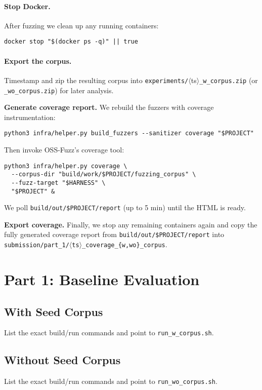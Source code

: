 \documentclass[11pt,a4paper,twocolumn]{article}
\begin{document}
\noindent \paragraph{Stop Docker.}
After fuzzing we clean up any running containers:
\begin{verbatim}
docker stop "$(docker ps -q)" || true
    \end{verbatim}

\noindent \paragraph{Export the corpus.}
Timestamp and zip the resulting corpus into \texttt{experiments/}\(\langle\)ts\(\rangle\)\texttt{\_w\_corpus.zip} (or \texttt{\_wo\_corpus.zip}) for later analysis.

\textbf{Generate coverage report.}
We rebuild the fuzzers with coverage instrumentation:
\begin{verbatim}
python3 infra/helper.py build_fuzzers --sanitizer coverage "$PROJECT"
    \end{verbatim}
Then invoke OSS-Fuzz’s coverage tool:
\begin{verbatim}
python3 infra/helper.py coverage \
  --corpus-dir "build/work/$PROJECT/fuzzing_corpus" \
  --fuzz-target "$HARNESS" \
  "$PROJECT" &
    \end{verbatim}
We poll \texttt{build/out/\$PROJECT/report} (up to 5 min) until the HTML is ready.

\textbf{Export coverage.}
Finally, we stop any remaining containers again and copy the fully generated
coverage report from \texttt{build/out/\$PROJECT/report} into
\texttt{submission/part\_1/\(\langle\)ts\(\rangle\)\_coverage\_{\{w,wo\}\_corpus}}.

\section{Part 1: Baseline Evaluation}

\subsection{With Seed Corpus}

List the exact build/run commands and point to \texttt{run\_w\_corpus.sh}.

\subsection{Without Seed Corpus}
List the exact build/run commands and point to \texttt{run\_wo\_corpus.sh}.
\end{document}
